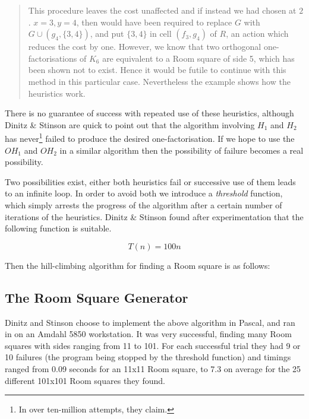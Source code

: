 \documentclass[
  11pt,
  a4paper]{book}
\begin{document}
\begin{quote}
This procedure leaves the cost unaffected and if instead we had
chosen at $2$. $x = 3, y = 4$, then would have been required to
replace $G$ with $G \cup (g_4,\{3,4\})$, and put $\{3, 4\}$ in
cell $(f_3, g_4)$ of $R$, an action which reduces the cost by one.
However, we know that two orthogonal one-factorisations of $K_6$
are equivalent to a Room square of side 5, which has been shown
not to exist. Hence it would be futile to continue with this
method in this particular case. Nevertheless the example shows
how the heuristics work.
 \end{quote}

There is no guarantee of success with repeated use of these
heuristics, although Dinitz \& Stinson are quick to point out that
the algorithm involving \(H_1\) and \(H_2\) has never\footnote{In over ten-million attempts, they claim.} failed to
produce the desired one-factorisation. If we hope to use the
\(OH_1\) and \(OH_2\) in a similar algorithm then the possibility of
failure becomes a real possibility.

Two possibilities exist, either both heuristics fail or
successive use of them leads to an infinite loop. In order to
avoid both we introduce a \emph{threshold} function, which simply
arrests the progress of the algorithm after a certain number of
iterations of the heuristics. Dinitz \& Stinson found after
experimentation that the following function is suitable.

\begin{equation}
T(n) = 100n
\end{equation}

Then the hill-climbing algorithm for finding a Room square is as
follows:

\begin{algorithm}[H]
\end{algorithm}

\hypertarget{the-room-square-generator}{%
\subsection{The Room Square Generator}\label{the-room-square-generator}}

Dinitz and Stinson choose to implement the above algorithm in
Pascal, and ran in on an Amdahl 5850 workstation. It was very
successful, finding many Room squares with sides ranging from 11
to 101. For each successful trial they had 9 or 10 failures (the
program being stopped by the threshold function) and timings
ranged from 0.09 seconds for an 11x11 Room square, to 7.3 on
average for the 25 different 101x101 Room squares they found.
\end{document}
